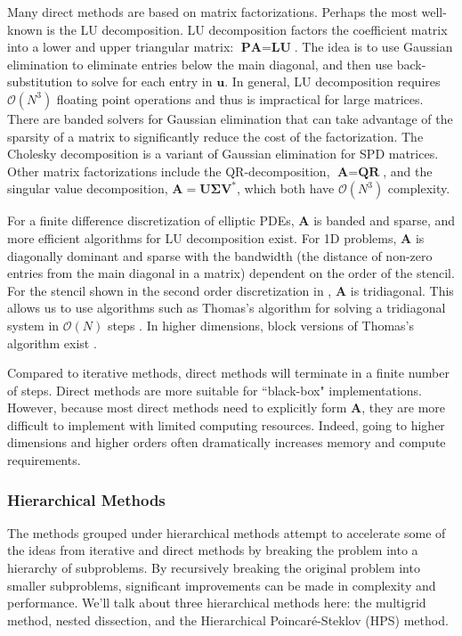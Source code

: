 Many direct methods are based on matrix factorizations. Perhaps the most well-known is the LU decomposition. LU decomposition factors the coefficient matrix into a lower and upper triangular matrix: $\textbf{P} \textbf{A} = \textbf{L} \textbf{U}$. The idea is to use Gaussian elimination to eliminate entries below the main diagonal, and then use back-substitution to solve for each entry in $\textbf{u}$. In general, LU decomposition requires $\mathcal{O}(N^3)$ floating point operations and thus is impractical for large matrices. There are banded solvers for Gaussian elimination that can take advantage of the sparsity of a matrix to significantly reduce the cost of the factorization. The Cholesky decomposition is a variant of Gaussian elimination for SPD matrices. Other matrix factorizations include the QR-decomposition, $\textbf{A} = \textbf{Q} \textbf{R}$, and the singular value decomposition, $\textbf{A} = \textbf{U} \boldsymbol{\Sigma} \textbf{V}^*$, which both have $\mathcal{O}(N^3)$ complexity.

For a finite difference discretization of elliptic PDEs, $\textbf{A}$ is banded and sparse, and more efficient algorithms for LU decomposition exist. For 1D problems, $\textbf{A}$ is diagonally dominant and sparse with the bandwidth (the distance of non-zero entries from the main diagonal in a matrix) dependent on the order of the stencil. For the stencil shown in the second order discretization in , $\textbf{A}$ is tridiagonal. This allows us to use algorithms such as Thomas's algorithm for solving a tridiagonal system in $\mathcal{O}(N)$ steps \citep{higham2002accuracy}. In higher dimensions, block versions of Thomas's algorithm exist \citep{quarteroni2010numerical}.

Compared to iterative methods, direct methods will terminate in a finite number of steps. Direct methods are more suitable for ``black-box" implementations. However, because most direct methods need to explicitly form $\textbf{A}$, they are more difficult to implement with limited computing resources. Indeed, going to higher dimensions and higher orders often dramatically increases memory and compute requirements.

\subsubsection{Hierarchical Methods}
\label{sub:hierarchical-methods}

The methods grouped under hierarchical methods attempt to accelerate some of the ideas from iterative and direct methods by breaking the problem into a hierarchy of subproblems. By recursively breaking the original problem into smaller subproblems, significant improvements can be made in complexity and performance. We'll talk about three hierarchical methods here: the multigrid method, nested dissection, and the Hierarchical Poincaré-Steklov (HPS) method.

